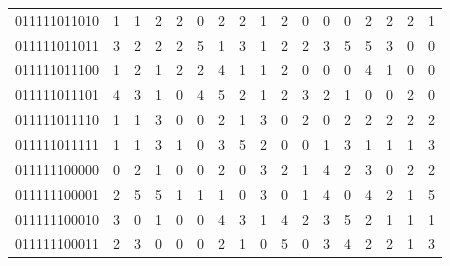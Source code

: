 \documentclass[10pt,a4paper]{article}
\begin{document}
\begin{longtable}{ |c|c|c|c|c|c|c|c|c|c|c|c|c|c|c|c|c| }
    011111011010              & 1                            & 1                                & 2                            & 2                              & 0   & 2   & 2   & 1   & 2   & 0   & 0   & 0   & 2   & 2   & 2   & 1   \\
    011111011011              & 3                            & 2                                & 2                            & 2                              & 5   & 1   & 3   & 1   & 2   & 2   & 3   & 5   & 5   & 3   & 0   & 0   \\
    011111011100              & 1                            & 2                                & 1                            & 2                              & 2   & 4   & 1   & 1   & 2   & 0   & 0   & 0   & 4   & 1   & 0   & 0   \\
    011111011101              & 4                            & 3                                & 1                            & 0                              & 4   & 5   & 2   & 1   & 2   & 3   & 2   & 1   & 0   & 0   & 2   & 0   \\
    011111011110              & 1                            & 1                                & 3                            & 0                              & 0   & 2   & 1   & 3   & 0   & 2   & 0   & 2   & 2   & 2   & 2   & 2   \\
    011111011111              & 1                            & 1                                & 3                            & 1                              & 0   & 3   & 5   & 2   & 0   & 0   & 1   & 3   & 1   & 1   & 1   & 3   \\
    011111100000              & 0                            & 2                                & 1                            & 0                              & 0   & 2   & 0   & 3   & 2   & 1   & 4   & 2   & 3   & 0   & 2   & 2   \\
    011111100001              & 2                            & 5                                & 5                            & 1                              & 1   & 1   & 0   & 3   & 0   & 1   & 4   & 0   & 4   & 2   & 1   & 5   \\
    011111100010              & 3                            & 0                                & 1                            & 0                              & 0   & 4   & 3   & 1   & 4   & 2   & 3   & 5   & 2   & 1   & 1   & 1   \\
    011111100011              & 2                            & 3                                & 0                            & 0                              & 0   & 2   & 1   & 0   & 5   & 0   & 3   & 4   & 2   & 2   & 1   & 3   \\

\end{longtable}
\end{document}
